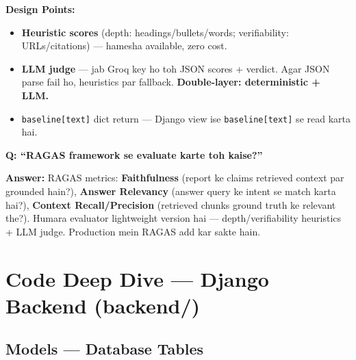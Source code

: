 \documentclass[11pt, a4paper]{article}
\begin{document}
\begin{codestorybox}
\textbf{Design Points:}
\begin{itemize}
\item \textbf{Heuristic scores} (depth: headings/bullets/words; verifiability: URLs/citations) --- hamesha available, zero cost.
\item \textbf{LLM judge} --- jab Groq key ho toh JSON scores + verdict. Agar JSON parse fail ho, heuristics par fallback. \textbf{Double-layer: deterministic + LLM.}
\item \texttt{baseline[\textquotedbl text\textquotedbl]} dict return --- Django view ise \texttt{baseline[\textquotedbl text\textquotedbl]} se read karta hai.
\end{itemize}
\end{codestorybox}

\begin{interviewbox}
\textbf{Q: ``RAGAS framework se evaluate karte toh kaise?''}

\textbf{Answer:} RAGAS metrics: \textbf{Faithfulness} (report ke claims retrieved context par grounded hain?), \textbf{Answer Relevancy} (answer query ke intent se match karta hai?), \textbf{Context Recall/Precision} (retrieved chunks ground truth ke relevant the?). Humara evaluator lightweight version hai --- depth/verifiability heuristics + LLM judge. Production mein RAGAS add kar sakte hain.
\end{interviewbox}

\newpage

\section{Code Deep Dive --- Django Backend (backend/)}\label{sec:django}

\subsection{Models --- Database Tables}
\end{document}
